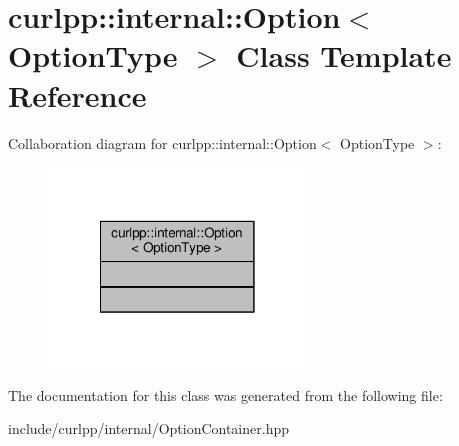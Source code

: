 \hypertarget{classcurlpp_1_1internal_1_1Option}{\section{curlpp\-:\-:internal\-:\-:Option$<$ Option\-Type $>$ Class Template Reference}
\label{classcurlpp_1_1internal_1_1Option}
}


Collaboration diagram for curlpp\-:\-:internal\-:\-:Option$<$ Option\-Type $>$\-:\nopagebreak
\begin{figure}[H]
\begin{center}
\leavevmode
\includegraphics[width=194pt]{classcurlpp_1_1internal_1_1Option__coll__graph}
\end{center}
\end{figure}


The documentation for this class was generated from the following file\-:\begin{DoxyCompactItemize}
\item 
include/curlpp/internal/Option\-Container.\-hpp\end{DoxyCompactItemize}
